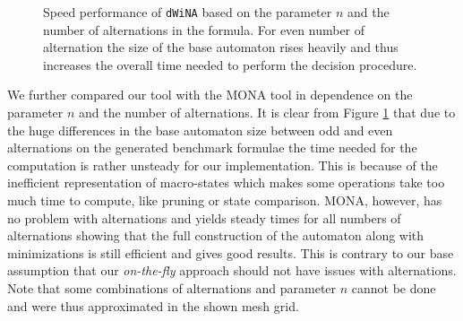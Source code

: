 \begin{figure}[h!]
 \begin{center}
 \end{center}
 \caption{Speed performance of \texttt{dWiNA} based on
 the parameter $n$ and the number of alternations in the formula. For
 even number of alternation the size of the base automaton rises
 heavily and thus increases the overall time needed to perform the
 decision procedure.}\label{alt-n}
\end{figure}
\newpage
We further compared our tool with the \textsc{MONA} tool in dependence on the
parameter $n$ and the number of alternations. It is clear from Figure
\ref{alt-n} that due to the huge differences in the base automaton size between
odd and even alternations on the generated benchmark formulae the time needed
for the computation is rather unsteady for our implementation. This is because
of the inefficient representation of macro-states which makes some operations
take too much time to compute, like pruning or state comparison. \textsc{MONA},
however, has no problem with alternations and yields steady times for all numbers of
alternations showing that the full construction of the automaton along with
minimizations is still efficient and gives good results. This is contrary to our base
assumption that our \emph{on-the-fly} approach should not have issues with
alternations. Note that some combinations of alternations and parameter $n$
cannot be done and were thus approximated in the shown mesh grid.

